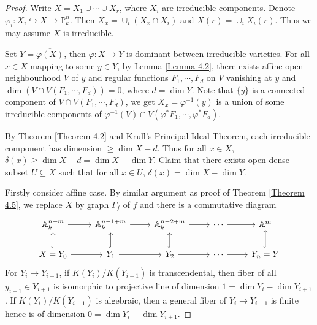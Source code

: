\documentclass{ctexart}
\begin{document}
\begin{proof}
    Write $X = X_{1} \cup \cdots \cup X_{r}$, where $X_{i}$ are irreducible components.
    Denote $\varphi_{i}: X_{i} \hookrightarrow X \rightarrow \mathbb{P}_{k}^{n}$.
    Then $X_{x} = \cup_{i} (X_{x} \cap X_{i})$ and $X(r) = \cup_{i} X_{i}(r)$.
    Thus we may assume $X$ is irreducible.
    \par
    Set $Y = \overline{\varphi(X)}$, then $\varphi: X \rightarrow Y$ is dominant between irreducible varieties.
    For all $x\in X$ mapping to some $y\in Y$, by Lemma \ref{Lemma 4.2}, 
    there exists affine open neighbourhood $V$ of $y$ and regular functions $F_{1}, \cdots, F_{d}$ on $V$ vanishing at $y$ and $\dim (V \cap V(F_{1}, \cdots, F_{d})) = 0$,
    where $d = \dim Y$.
    Note that $\{y\}$ is a connected component of $V \cap V(F_{1}, \cdots, F_{d})$, we get $X_{x} = \varphi^{-1}(y)$ is a union of some irreducible components of $\varphi^{-1}(V) \cap V(\varphi^{\ast}F_{1}, \cdots, \varphi^{\ast}F_{d})$.
    \par
    By Theorem \ref{Theorem 4.2} and Krull's Principal Ideal Theorem, each irreducible component has dimension $\ge \dim X - d$.
    Thus for all $x\in X$, $\delta(x) \ge \dim X - d = \dim X - \dim Y$.
    Claim that there exists open dense subset $U \subseteq X$ such that for all $x\in U$, $\delta(x) = \dim X - \dim Y$.
    \par
    Firstly consider affine case.
    By similar argument as proof of Theorem \ref{Theorem 4.5}, we replace $X$ by graph $\Gamma_{f}$ of $f$ and there is a commutative diagram
    \begin{equation}
        \begin{tikzcd}
            \mathbb{A}_{k}^{n + m} \arrow[r] &
            \mathbb{A}_{k}^{n - 1 + m} \arrow[r] &
            \mathbb{A}_{k}^{n - 2 + m} \arrow[r] &
            \cdots \arrow[r] &
            \mathbb{A}^{m} \\
            X = Y_{0} \arrow[u, hookrightarrow] \arrow[r] &
            Y_{1} \arrow[u, hookrightarrow] \arrow[r] &
            Y_{2} \arrow[u, hookrightarrow] \arrow[r] &
            \cdots \arrow[r] &
            Y_{n} = Y \arrow[u, hookrightarrow]
        \end{tikzcd}
    \end{equation}
    For $Y_{i} \rightarrow Y_{i + 1}$, if $K(Y_{i})/K(Y_{i + 1})$ is transcendental,
    then fiber of all $y_{i + 1}\in Y_{i + 1}$ is isomorphic to projective line of dimension $1 = \dim Y_{i} - \dim Y_{i + 1}$.
    If $K(Y_{i})/K(Y_{i + 1})$ is algebraic, then a general fiber of $Y_{i} \rightarrow Y_{i + 1}$ is finite hence is of dimension $0 = \dim Y_{i} - \dim Y_{i + 1}$.

\end{proof}
\end{document}
